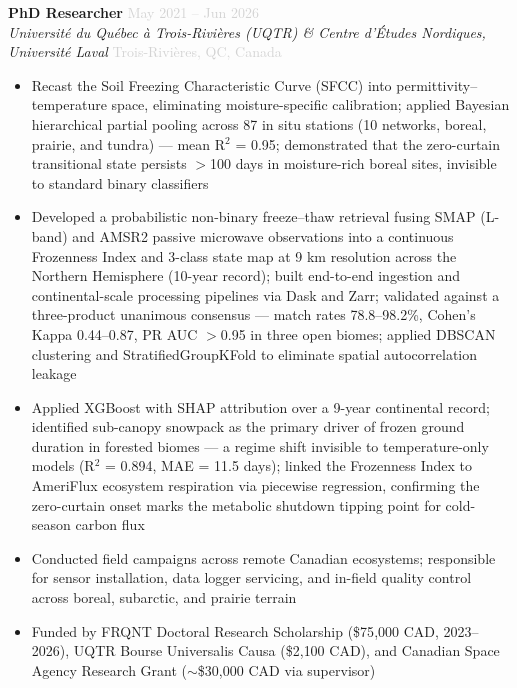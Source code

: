 \documentclass[10pt, a4paper]{article}
\newcommand{\dategray}[1]{\textcolor{lightgray}{\small #1}}
\newcommand{\jobtitle}[4]{%
  \noindent\textbf{#1} \hfill \dategray{#3} \\
  \textit{#2} \hfill \dategray{#4} \\[-4pt]
}
\begin{document}
\jobtitle{PhD Researcher}
         {Université du Québec à Trois-Rivières (UQTR) \& Centre d'Études Nordiques, Université Laval}
         {May 2021 – Jun 2026}
         {Trois-Rivières, QC, Canada}
\begin{itemize}
  \item Recast the Soil Freezing Characteristic Curve (SFCC) into
        permittivity–temperature space, eliminating moisture-specific
        calibration; applied Bayesian hierarchical partial pooling across
        87 in situ stations (10 networks, boreal, prairie, and tundra) —
        mean R$^{2}$ = 0.95; demonstrated that the zero-curtain transitional
        state persists $>$100 days in moisture-rich boreal sites, invisible
        to standard binary classifiers
  \item Developed a probabilistic non-binary freeze–thaw retrieval fusing
        SMAP (L-band) and AMSR2 passive microwave observations into a
        continuous Frozenness Index and 3-class state map at 9 km resolution
        across the Northern Hemisphere (10-year record); built end-to-end
        ingestion and continental-scale processing pipelines via Dask and
        Zarr; validated against a three-product unanimous consensus ---
        match rates 78.8--98.2\%, Cohen's Kappa 0.44--0.87, PR AUC $>$0.95
        in three open biomes; applied DBSCAN clustering and
        StratifiedGroupKFold to eliminate spatial autocorrelation leakage
  \item Applied XGBoost with SHAP attribution over a 9-year continental
        record; identified sub-canopy snowpack as the primary driver of
        frozen ground duration in forested biomes --- a regime shift
        invisible to temperature-only models (R$^{2}$ = 0.894,
        MAE = 11.5 days); linked the Frozenness Index to AmeriFlux
        ecosystem respiration via piecewise regression, confirming the
        zero-curtain onset marks the metabolic shutdown tipping point for
        cold-season carbon flux
  \item Conducted field campaigns across remote Canadian ecosystems;
        responsible for sensor installation, data logger servicing, and
        in-field quality control across boreal, subarctic, and prairie terrain
  \item Funded by FRQNT Doctoral Research Scholarship (\$75{,}000 CAD,
        2023--2026), UQTR Bourse Universalis Causa (\$2{,}100 CAD), and
        Canadian Space Agency Research Grant ($\sim$\$30{,}000 CAD via
        supervisor)
\end{itemize}
\end{document}
